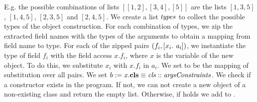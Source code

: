 E.g. the possible combinations of lists $[[1, 2], [3, 4], [5]]$
are the lists $[1, 3, 5]$, $[1, 4, 5]$, $[2, 3, 5]$ and $[2, 4, 5]$.
We create a list $\mathit{types}$ to collect
the possible types of the object construction.
For each combination of types,
we zip the extracted field names
with the types of the arguments
to obtain a mapping from field name to type.
For each of the zipped pairs $(f_i, [x_i.\ \mathit{a_i}])$,
we instantiate the type of field $f_i$
with the field access $x.f_i$,
where $x$ is the variable of the new object.
To do this, we substitute $x_i$ with $x.f_i$ in $a_i$.
We set  to be the mapping of
substitution  over all pairs.
We set $b := \mathit{x}.\textbf{cls} \equiv \mathit{cls} :: \mathit{argsConstraints}$.
We check if a constructor 
exists in the program.
If not, we can not create a new object of a non-existing class
and return the empty list.
Otherwise, if 
holds we add  to .


